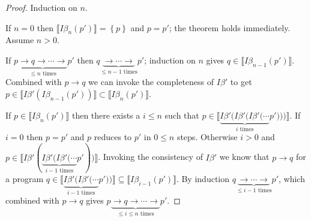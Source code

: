 \documentclass{article}
\newcommand{\denotation}[1]{{\llbracket #1 \rrbracket}}
\newcommand{\code}[1]{{\footnotesize\texttt{#1}}}
\newcommand{\shift}[1]{\uparrow^{#1}}
\newcommand{\reduce}{\longrightarrow}
\newtheorem{theorem}{Theorem}
\begin{document}
\begin{proof}
  Induction on $n$.

  If $n = 0$
  then $\denotation{I\beta_n(p')} = \left\{p \right\}$
  and $p = p'$;
  the theorem holds immediately. Assume $n > 0$.
  
  If $p\underbrace{\reduce q\reduce\cdots\reduce}_{\text{$\leq n$ times}} p'$
  then $q\underbrace{\reduce\cdots\reduce}_{\text{$\leq n - 1$ times}} p'$;
  induction on $n$
  gives $q\in \denotation{I\beta_{n - 1}(p')}$.
  Combined with $p\reduce q$ we can invoke the completeness of $I\beta'$
  to get $p\in \denotation{I\beta'(I\beta_{n - 1}(p'))}\subset\denotation{I\beta_n(p')}$.
  
  If $p\in \denotation{I\beta_n(p')}$
  then
  there exists a $i\leq n$
  such that $p\in \denotation{\underbrace{I\beta'(I\beta'(I\beta'(\cdots}_{i \text{ times}} p')))}$.
  If $i = 0$
  then $p = p'$ and $p$ reduces to $p'$ in $0\leq n$ steps.
  Otherwise $i > 0$
  and $p\in \denotation{I\beta'(\underbrace{I\beta'(I\beta'(\cdots}_{i - 1 \text{ times}} p'))}$.
  Invoking the
  consistency of $I\beta'$
  we know that $p\reduce q$
  for a program $q\in \denotation{\underbrace{I\beta'(I\beta'(\cdots}_{i - 1 \text{ times}} p'))}\subseteq\denotation{I\beta_{i - 1}(p')}$.
  By induction $q\underbrace{\reduce\cdots\reduce}_{\text{$\leq i - 1$ times}} p'$,
  which combined with $p\reduce q$
  gives  $p\underbrace{\reduce q\reduce\cdots\reduce}_{\text{$\leq i\leq n$ times}} p'$.  
\end{proof}

\end{document}
